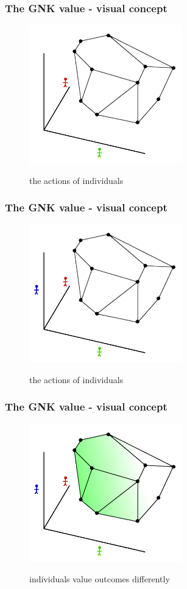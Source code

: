 \begin{frame} \frametitle{The GNK value - visual concept} \begin{figure} \begin{center} \includegraphics[height=6cm]{figs/pp4} \end{center} the actions of individuals \end{figure} \end{frame}
\begin{frame} \frametitle{The GNK value - visual concept} \begin{figure} \begin{center} \includegraphics[height=6cm]{figs/pp5} \end{center} the actions of individuals \end{figure} \end{frame}
\begin{frame} \frametitle{The GNK value - visual concept} \begin{figure} \begin{center} \includegraphics[height=6cm]{figs/pp6} \end{center} individuals value outcomes differently \end{figure} \end{frame}
